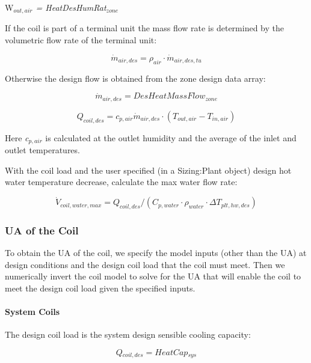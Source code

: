 W\emph{\(_{out,air}\) = HeatDesHumRat\(_{zone}\)}

If the coil is part of a terminal unit the mass flow rate is determined by the volumetric flow rate of the terminal unit:

\begin{equation}
\dot m_{air,des} = \rho_{air} \cdot \dot m_{air,des,tu}
\end{equation}

Otherwise the design flow is obtained from the zone design data array:

\begin{equation}
\dot m_{air,des} = DesHeatMassFlow_{zone}
\end{equation}

\begin{equation}
Q_{coil,des} = c_{p,air} \dot m_{air,des} \cdot (T_{out,air} - T_{in,air})
\end{equation}

Here \emph{c\(_{p,air}\)} is calculated at the outlet humidity and the average of the inlet and outlet temperatures.

With the coil load and the user specified (in a Sizing:Plant object) design hot water temperature decrease, calculate the max water flow rate:

\begin{equation}
\dot V_{coil,water,max} = Q_{coil,des}/(C_{p,water} \cdot \rho_{water} \cdot \Delta T_{plt,hw,des})
\end{equation}

\subsubsection{UA of the Coil}\label{ua-of-the-coil}

To obtain the UA of the coil, we specify the model inputs (other than the UA) at design conditions and the design coil load that the coil must meet. Then we numerically invert the coil model to solve for the UA that will enable the coil to meet the design coil load given the specified inputs.

\paragraph{System Coils}\label{system-coils-1}

The design coil load is the system design sensible cooling capacity:

\begin{equation}
\textit{Q\(_{coil,des}\)} = \textit{HeatCap\(_{sys}\)}
\end{equation}

